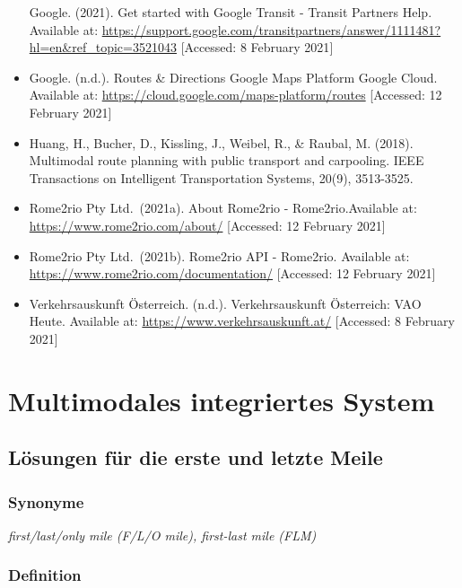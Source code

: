 \documentclass[
]{book}
\begin{document}
\begin{itemize}
  Google. (2021). Get started with Google Transit - Transit Partners Help. Available at: \url{https://support.google.com/transitpartners/answer/1111481?hl=en\&ref_topic=3521043} {[}Accessed: 8 February 2021{]}
\item
  Google. (n.d.). Routes \& Directions \textbar{} Google Maps Platform \textbar{} Google Cloud. Available at: \url{https://cloud.google.com/maps-platform/routes} {[}Accessed: 12 February 2021{]}
\item
  Huang, H., Bucher, D., Kissling, J., Weibel, R., \& Raubal, M. (2018). Multimodal route planning with public transport and carpooling. IEEE Transactions on Intelligent Transportation Systems, 20(9), 3513-3525.
\item
  Rome2rio Pty Ltd.~(2021a). About Rome2rio - Rome2rio.Available at: \url{https://www.rome2rio.com/about/} {[}Accessed: 12 February 2021{]}
\item
  Rome2rio Pty Ltd.~(2021b). Rome2rio API - Rome2rio. Available at: \url{https://www.rome2rio.com/documentation/} {[}Accessed: 12 February 2021{]}
\item
  Verkehrsauskunft Österreich. (n.d.). Verkehrsauskunft Österreich: VAO Heute. Available at: \url{https://www.verkehrsauskunft.at/} {[}Accessed: 8 February 2021{]}
\end{itemize}

\hypertarget{multimodal}{%
\chapter{Multimodales integriertes System}\label{multimodal}}

\hypertarget{flms}{%
\section{Lösungen für die erste und letzte Meile}\label{flms}}

\hypertarget{synonyme-19}{%
\subsection*{Synonyme}\label{synonyme-19}}

\emph{first/last/only mile (F/L/O mile), first-last mile (FLM)}

\hypertarget{definition-22}{%
\subsection*{Definition}\label{definition-22}}
\end{document}
